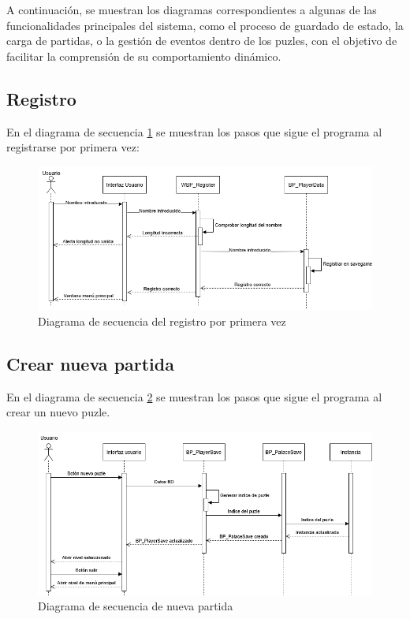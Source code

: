 A continuación, se muestran los diagramas correspondientes a algunas de las funcionalidades principales del sistema, como el proceso de guardado de estado, la carga de partidas, o la gestión de eventos dentro de los puzles, con el objetivo de facilitar la comprensión de su comportamiento dinámico.

\subsection{Registro}
En el diagrama de secuencia \ref{fig:diagrama_secuencia_registro} se muestran los pasos que sigue el programa al registrarse por primera vez:
\begin{figure}[H]
    \centering
    \includegraphics[width=\textwidth]{../img/anexos/diagrama_secuencia_registro.png}
    \caption[Diagrama de secuencia de registro]{Diagrama de secuencia del registro por primera vez}
    \label{fig:diagrama_secuencia_registro}
\end{figure}

\subsection{Crear nueva partida}
En el diagrama de secuencia \ref{fig:diagrama_secuencia_nuevopuzle} se muestran los pasos que sigue el programa al crear un nuevo puzle.
\begin{figure}[H]
    \centering
    \includegraphics[width=\textwidth]{../img/anexos/diagrama_secuencia_nuevopuzle.png}
    \caption[Diagrama de secuencia de nueva partida]{Diagrama de secuencia de nueva partida}
    \label{fig:diagrama_secuencia_nuevopuzle}
\end{figure}

